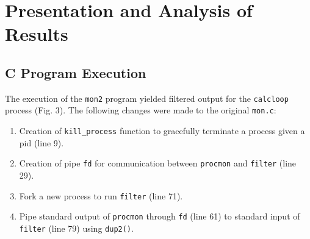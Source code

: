 \documentclass[a4paper,12pt]{article}
\begin{document}
\section{Presentation and Analysis of Results}
\subsection{C Program Execution}
The execution of the \texttt{mon2} program yielded filtered output for the \texttt{calcloop} process (Fig. 3). The following changes were made to the original \texttt{mon.c}:
\begin{enumerate}
    \item Creation of \texttt{kill\_process} function to gracefully terminate a process given a pid (line 9).
    \item Creation of pipe \texttt{fd} for communication between \texttt{procmon} and \texttt{filter} (line 29).
    \item Fork a new process to run \texttt{filter} (line 71).
    \item Pipe standard output of \texttt{procmon} through \texttt{fd} (line 61) to standard input of \texttt{filter} (line 79) using \texttt{dup2()}.
\end{enumerate}
\end{document}
